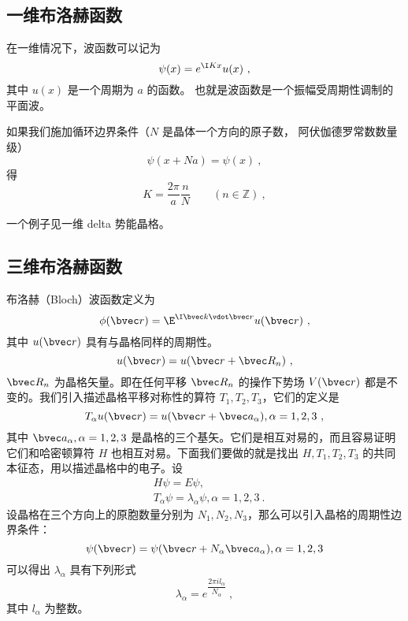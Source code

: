 
\subsection{一维布洛赫函数}
在一维情况下，波函数可以记为
\begin{equation}
\psi(x) = e^{\I K x} u(x)~,
\end{equation}
其中 $u(x)$ 是一个周期为 $a$ 的函数。 也就是波函数是一个振幅受周期性调制的平面波。

如果我们施加循环边界条件（$N$ 是晶体一个方向的原子数， 阿伏伽德罗常数数量级）
\begin{equation}
\psi(x+Na) = \psi(x)~,
\end{equation}
得
\begin{equation}
K = \frac{2\pi}{a} \frac{n}{N} \qquad (n \in \mathbb Z)~,
\end{equation}

一个例子见一维 delta 势能晶格。

\subsection{三维布洛赫函数}

\cite{黄昆}\cite{Bransden}布洛赫（Bloch）波函数定义为
\begin{equation}\label{eq_Bloch_3}
\phi(\bvec r) = \E^{\I \bvec k \vdot \bvec r} u(\bvec r)~,
\end{equation}
其中 $u(\bvec r)$ 具有与晶格同样的周期性。
\begin{equation}
u(\bvec r)=u(\bvec r+\bvec R_n)~,
\end{equation}
$\bvec R_n$ 为晶格矢量。即在任何平移 $\bvec R_n$ 的操作下势场 $V(\bvec r)$ 都是不变的。我们引入描述晶格平移对称性的算符 $T_1,T_2,T_3$，它们的定义是
\begin{equation}
T_\alpha u(\bvec r)= u(\bvec r+\bvec a_\alpha),\alpha=1,2,3~,
\end{equation}
其中 $\bvec a_\alpha,\alpha=1,2,3$ 是晶格的三个基矢。它们是相互对易的，而且容易证明它们和哈密顿算符 $H$ 也相互对易。下面我们要做的就是找出 $H,T_1,T_2,T_3$ 的共同本征态，用以描述晶格中的电子。设
\begin{equation}
\begin{aligned}
&H\psi=E\psi,\\
&T_\alpha \psi = \lambda_\alpha \psi, \alpha=1,2,3~.
\end{aligned}
\end{equation}
设晶格在三个方向上的原胞数量分别为 $N_1,N_2,N_3$，那么可以引入晶格的周期性边界条件：
\begin{equation}
\psi(\bvec r)=\psi(\bvec r+N_\alpha \bvec a_\alpha),\alpha=1,2,3
\end{equation}
可以得出 $\lambda_\alpha$ 具有下列形式
\begin{equation}
\lambda_\alpha=e^{ \dfrac{2\pi i l_\alpha}{N_\alpha}}~,
\end{equation}
其中 $l_\alpha$ 为整数。

